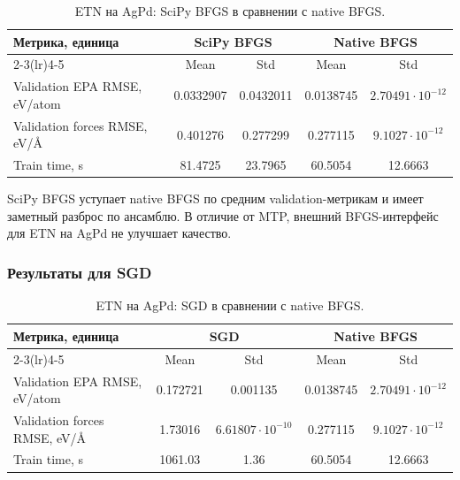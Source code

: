 \begin{table}[H]
\centering
\small
\caption{ETN на AgPd: SciPy BFGS в сравнении с native BFGS.}
\label{tab:etn-agpd-scipy-bfgs}
\begin{tabular}{lcccc}
\toprule
\multirow{2}{*}{Метрика, единица} & \multicolumn{2}{c}{SciPy BFGS} & \multicolumn{2}{c}{Native BFGS} \\
\cmidrule(lr){2-3}\cmidrule(lr){4-5}
 & Mean & Std & Mean & Std \\
\midrule
Validation EPA RMSE, eV/atom & 0.0332907 & 0.0432011 & 0.0138745 & \(2.70491\cdot 10^{-12}\) \\
Validation forces RMSE, eV/\AA & 0.401276 & 0.277299 & 0.277115 & \(9.1027\cdot 10^{-12}\) \\
Train time, s & 81.4725 & 23.7965 & 60.5054 & 12.6663 \\
\bottomrule
\end{tabular}
\end{table}


SciPy BFGS уступает native BFGS по средним validation-метрикам и имеет заметный разброс по ансамблю. В отличие от MTP, внешний BFGS-интерфейс для ETN на AgPd не улучшает качество.

\FloatBarrier

\subsubsection{Результаты для SGD}

\begin{table}[H]
\centering
\small
\caption{ETN на AgPd: SGD в сравнении с native BFGS.}
\label{tab:etn-agpd-sgd}
\begin{tabular}{lcccc}
\toprule
\multirow{2}{*}{Метрика, единица} & \multicolumn{2}{c}{SGD} & \multicolumn{2}{c}{Native BFGS} \\
\cmidrule(lr){2-3}\cmidrule(lr){4-5}
 & Mean & Std & Mean & Std \\
\midrule
Validation EPA RMSE, eV/atom & 0.172721 & 0.001135 & 0.0138745 & \(2.70491\cdot 10^{-12}\) \\
Validation forces RMSE, eV/\AA & 1.73016 & \(6.61807\cdot 10^{-10}\) & 0.277115 & \(9.1027\cdot 10^{-12}\) \\
Train time, s & 1061.03 & 1.36 & 60.5054 & 12.6663 \\
\bottomrule
\end{tabular}
\end{table}


